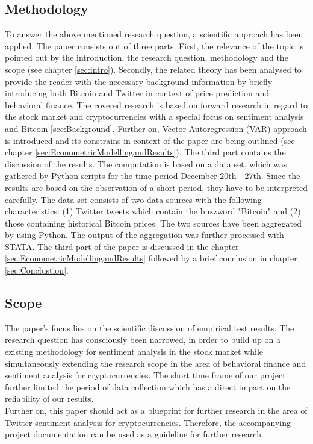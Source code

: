 \documentclass[a4paper,american,12pt]{article}
\begin{document}
\begin{spacing}{1.2}
\subsection{Methodology}
\label{sec:Methodology}
To answer the above mentioned research question, a scientific approach has been applied. The paper consists out of three parts. First, the relevance of the topic is pointed out by the introduction, the research question, methodology and the scope (see chapter \ref{sec:intro}). Secondly, the related theory has been analysed to provide the reader with the necessary background information by briefly introducing both Bitcoin and Twitter in context of price prediction and behavioral finance. The covered research is based on forward research in regard to the stock market and cryptocurrencies with a special focus on sentiment analysis and Bitcoin \ref{sec:Background}. Further on,  Vector Autoregression (VAR) approach is introduced and its constrains in context of the paper are being outlined (see chapter \ref{sec:EconometricModellingandResults}). The third part contains the discussion of the results. The computation is based on a data set, which was gathered by Python scripts for the time period December 20th - 27th. Since the results are based on the observation of a short period, they have to be interpreted carefully. The data set consists of two data sources with the following characteristics: (1) Twitter tweets which contain the buzzword "Bitcoin" and (2) those containing historical Bitcoin prices. The two sources have been aggregated by using Python. The output of the aggregation was further processed with STATA. The third part of the paper is discussed in the chapter \ref{sec:EconometricModellingandResults} followed by a brief conclusion in chapter \ref{sec:Conclustion}.

\subsection{Scope}
\label{sec:Scope}
The paper's focus lies on the scientific discussion of empirical test results. The research question has consciously been narrowed, in order to build up on a existing methodology for sentiment analysis in the stock market while simultaneously extending the research scope in the area of behavioral finance and sentiment analysis for cryptocurrencies. The short time frame of our project further limited the period of data collection which has a direct impact on the reliability of our results.\\
Further on, this paper should act as a blueprint for further research in the area of Twitter sentiment analysis for cryptocurrencies. Therefore, the accompanying project documentation can be used as a guideline for further research.


\end{spacing}
\end{document}
